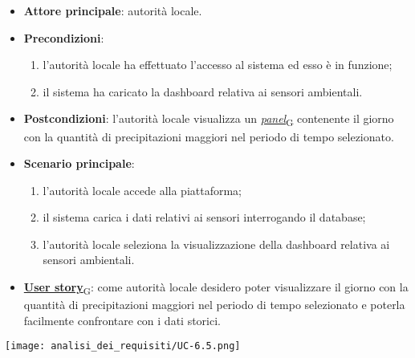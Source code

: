 \begin{itemize}
	\item \textbf{Attore principale}: autorità locale.
	\item \textbf{Precondizioni}:
	      \begin{enumerate}
		      \item l'autorità locale ha effettuato l'accesso al sistema ed esso è in funzione;
		      \item il sistema ha caricato la dashboard relativa ai sensori ambientali.
	      \end{enumerate}
	\item \textbf{Postcondizioni}: l'autorità locale visualizza un \href{https://7last.github.io/docs/rtb/documentazione-interna/glossario\#panel}{\textit{panel}\textsubscript{G}} contenente il giorno con la quantità di precipitazioni maggiori nel periodo di tempo selezionato.
	\item \textbf{Scenario principale}:
	      \begin{enumerate}
		      \item l'autorità locale accede alla piattaforma;
		      \item il sistema carica i dati relativi ai sensori interrogando il database;
		      \item l'autorità locale seleziona la visualizzazione della dashboard relativa ai sensori ambientali.
	      \end{enumerate}
	\item \href{https://7last.github.io/docs/rtb/documentazione-interna/glossario\#user-story}{\textbf{User story}\textsubscript{G}}:
	      come autorità locale desidero poter visualizzare il giorno con la quantità di precipitazioni maggiori nel periodo di tempo selezionato
	      e poterla facilmente confrontare con i dati storici.
\end{itemize}
\begin{center}
	\texttt{[image: analisi\_dei\_requisiti/UC-6.5.png]}
\end{center}


